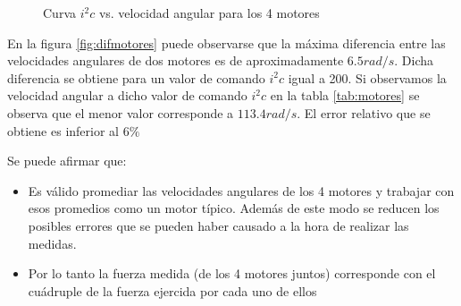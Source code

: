 \documentclass[main]{subfiles}
\begin{document}
\begin{figure}[h!]
  \begin{center}
		
  \end{center}
  \caption{Curva $i^2c$ vs. velocidad angular para los 4 motores}

\end{figure}

En la figura \ref{fig:difmotores} puede observarse que la m\'axima diferencia entre las velocidades angulares de dos motores es de aproximadamente $6.5 rad/s$. Dicha diferencia se obtiene para un valor de comando $i^2c$ igual a 200. Si observamos la velocidad angular a dicho valor de comando $i^2c$ en la tabla \ref{tab:motores} se observa que el menor valor corresponde a $113.4 rad/s$. El error relativo que se obtiene es inferior al $6\%$


Se puede afirmar que:
\begin{itemize}
\item Es v\'alido promediar las velocidades angulares de los 4 motores y trabajar con esos promedios como un motor típico. Adem\'as de este modo se reducen los posibles errores que se pueden haber causado a la hora de realizar las medidas.
\item Por lo tanto la fuerza medida (de los 4 motores juntos) corresponde con el cu\'adruple de la fuerza ejercida por cada uno de ellos
\end{itemize}
\end{document}
